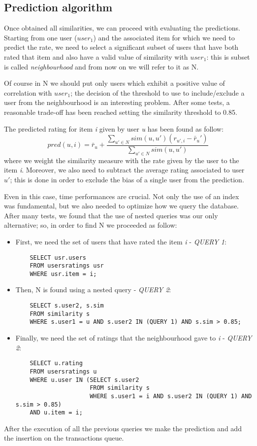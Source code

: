 \subsection{Prediction algorithm}
Once obtained all similarities, we can proceed with evaluating the predictions. Starting from one user ($user_1$) and the associated item for which we need to predict the rate, we need to select a significant subset of users that have both rated that item and also have a valid value of similarity with $user_1$: this is subset is called \textit{neighbourhood} and from now on we will refer to it as N.

Of course in N we should put only users which exhibit a positive value of correlation with $user_1$; the decision of the threshold to use to include/exclude a user from the neighbourhood is an interesting problem. After some tests, a reasonable trade-off has been reached setting the similarity threshold to 0.85.

The predicted rating for item \textit{i} given by user \textit{u} has been found as follow:
\begin{equation}
	pred(u,i) = \bar{r}_u + 
	\frac{
		\sum_{u' \in N} sim(u,u') (r_{u',i} - \bar{r}_u')
	}{
		\sum_{u' \in N} sim(u,u')
	}
\end{equation}
where we weight the similarity measure with the rate given by the user to the item \textit{i}. Moreover, we also need to subtract the average rating associated to user \textit{$u'$}; this is done in order to exclude the bias of a single user from the prediction.

Even in this case, time performances are crucial. Not only the use of an index was fundamental, but we also needed to optimize how we query the database. After many tests, we found that the use of nested queries was our only alternative; so, in order to find N we proceeded as follow:
\begin{itemize}
	\item First, we need the set of users that have rated the item \textit{i} - \textit{QUERY 1}:
	\begin{verbatim}
	SELECT usr.users
	FROM usersratings usr
	WHERE usr.item = i;
	\end{verbatim}
	\item Then, N is found using a nested query - \textit{QUERY 2}:
	\begin{verbatim}
	SELECT s.user2, s.sim
	FROM similarity s
	WHERE s.user1 = u AND s.user2 IN (QUERY 1) AND s.sim > 0.85;
	\end{verbatim}
	\item Finally, we need the set of ratings that the neighbourhood gave to \textit{i} - \textit{QUERY 2}:
	\begin{verbatim}
	SELECT u.rating 
	FROM usersratings u 
	WHERE u.user IN (SELECT s.user2
					 FROM similarity s
					 WHERE s.user1 = i AND s.user2 IN (QUERY 1) AND s.sim > 0.85) 
	AND u.item = i;
	\end{verbatim}	
\end{itemize}
After the execution of all the previous queries we make the prediction and add the insertion on the transactions queue.